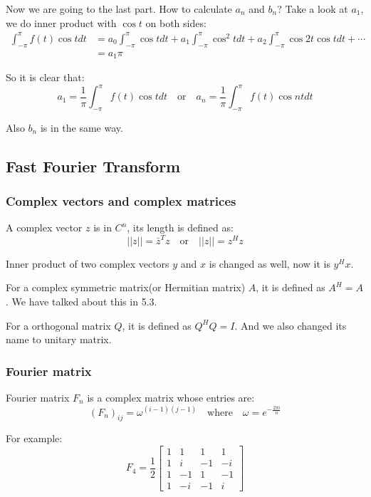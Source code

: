 \documentclass[12pt]{ctexart}
\begin{document}
Now we are going to the last part. How to calculate $a_n$ and $b_n$? Take a look at $a_1$,
we do inner product with $\cos t$ on both sides:
\begin{align*}
  \int_{-\pi}^{\pi} f(t) \cos t dt &= a_0 \int_{-\pi}^{\pi} \cos t dt +
  a_1 \int_{-\pi}^{\pi} \cos^2 t dt +
  a_2 \int_{-\pi}^{\pi} \cos 2t \cos t dt + \cdots \\
  &= a_1 \pi
\end{align*}

So it is clear that:
\[
  a_1 = \frac{1}{\pi} \int_{-\pi}^{\pi} f(t) \cos t dt \quad \text{or} \quad
  a_n = \frac{1}{\pi} \int_{-\pi}^{\pi} f(t) \cos nt dt
\]

Also $b_n$ is in the same way.

\subsection{\textbf{Fast Fourier Transform}}
\subsubsection{\textbf{Complex vectors and complex matrices}}

A complex vector $z$ is in $C^n$, its length is defined as:
\[
  ||z|| = \bar{z}^{T} z \quad \text{or} \quad ||z|| = z^{H} z
\]

Inner product of two complex vectors $y$ and $x$ is changed as well, now it is $y^{H} x$.

For a complex symmetric matrix(or Hermitian matrix) $A$, it is defined as $A^{H} = A$.
We have talked about this in 5.3.

For a orthogonal matrix $Q$, it is defined as $Q^{H}Q = I$. And we also changed its name
to unitary matrix.

\subsubsection{\textbf{Fourier matrix}}

Fourier matrix $F_n$ is a complex matrix whose entries are:
\[
  (F_n)_{ij} = \omega^{(i-1)(j-1)} \quad \text{where} \quad
  \omega = e^{-\frac{2\pi i}{n}}
\]

For example:
\[
  F_4 = \frac12 \begin{bmatrix}
    1 & 1 & 1 & 1 \\
    1 & i & -1 & -i \\
    1 & -1 & 1 & -1 \\
    1 & -i & -1 & i
  \end{bmatrix}
\]
\end{document}
